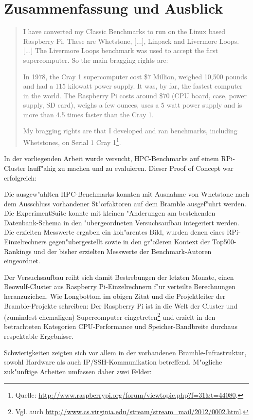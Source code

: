 \chapter{Zusammenfassung und Ausblick}\label{Kap5}
\begin{quote}
\onehalfspacing
I have converted my Classic Benchmarks to run on the Linux based Raspberry Pi. These are Whetstone, [...], Linpack and Livermore Loops. [...] The Livermore Loops benchmark was used to accept the first supercomputer. So the main bragging rights are:

In 1978, the Cray 1 supercomputer cost \$7 Million, weighed 10,500 pounds and had a 115 kilowatt power supply. It was, by far, the fastest computer in the world. The Raspberry Pi costs around \$70 (CPU board, case, power supply, SD card), weighs a few ounces, uses a 5 watt power supply and is more than 4.5 times faster than the Cray 1. 

My bragging rights are that I developed and ran benchmarks, including Whetstones, on Serial 1 Cray 1\footnote{Quelle: \url{http://www.raspberrypi.org/forum/viewtopic.php?f=31&t=44080}.}.
\end{quote}

In der vorliegenden Arbeit wurde versucht, HPC-Benchmarks auf einem RPi-Cluster lauff"ahig zu machen und zu evaluieren. Dieser Proof of Concept war erfolgreich: 

Die ausgew"ahlten HPC-Benchmarks konnten mit Ausnahme von Whetstone nach dem Ausschluss vorhandener St"orfaktoren auf dem Bramble ausgef"uhrt werden. Die ExperimentSuite konnte mit kleinen "Anderungen am bestehenden Datenbank-Schema in den "ubergeordneten Versuchsaufbau integeriert werden. Die erzielten Messwerte ergaben ein koh"arentes Bild, wurden denen eines RPi-Einzelrechners gegen"ubergestellt sowie in den gr"o\ss eren Kontext der Top500-Rankings und der bisher erzielten Messwerte der Benchmark-Autoren eingeordnet. 

Der Versuchsaufbau reiht sich damit Bestrebungen der letzten Monate, einen Beowulf-Cluster aus Raspberry Pi-Einzelrechnern f"ur verteilte Berechnungen heranzuziehen. Wie Longbottom im obigen Zitat und die Projektleiter der Bramble-Projekte schreiben: Der Raspberry Pi ist in die Welt der Cluster und (zumindest ehemaligen) Supercomputer eingetreten\footnote{Vgl. auch \url{http://www.cs.virginia.edu/stream/stream_mail/2012/0002.html}.} und erzielt in den betrachteten Kategorien CPU-Performance und Speicher-Band\-breite durchaus respektable Ergebnisse. 

Schwierigkeiten zeigten sich vor allem in der vorhandenen Bramble-Infrastruktur, sowohl Hardware als auch IP/SSH-Kommunikation betreffend. M"ogliche zuk"unftige Arbeiten umfassen daher zwei Felder: 

